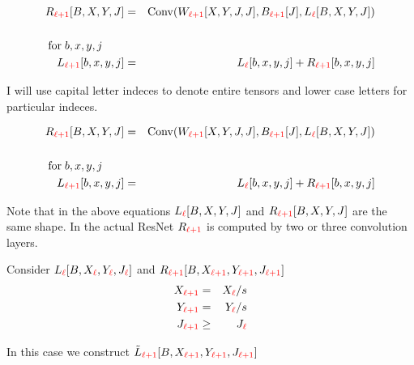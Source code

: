 {\medskip
\begin{eqnarray*}
R_{\color{red} \ell+1}[B,X,Y,J] & = & \mathrm{Conv}(W_{\color{red} \ell+1}[X,Y,J,J],B_{\color{red} \ell+1}[J],L_{\color{red} \ell}[B,X,Y,J]) \\
\\
\mathrm{for}\;b,x,y,j\;\;\;\;\;\;\;\\
L_{\color{red} \ell+1}[b,x,y,j] & = & L_{\color{red}\ell}[b,x,y,j] + R_{\color{red} \ell+1}[b,x,y,j]
\end{eqnarray*}

\vfill I will use capital letter indeces to denote entire tensors and lower case letters for particular indeces.


\medskip
\begin{eqnarray*}
R_{\color{red} \ell+1}[B,X,Y,J] & = & \mathrm{Conv}(W_{\color{red} \ell+1}[X,Y,J,J],B_{\color{red} \ell+1}[J],L_{\color{red} \ell}[B,X,Y,J]) \\
\\
\mathrm{for}\;b,x,y,j\;\;\;\;\;\;\;\\
L_{\color{red} \ell+1}[b,x,y,j] & = & L_{\color{red}\ell}[b,x,y,j] + R_{\color{red} \ell+1}[b,x,y,j]
\end{eqnarray*}

\vfill Note that in the above equations $L_{\color{red} \ell}[B,X,Y,J]$ and $R_{\color{red} \ell+1}[B,X,Y,J]$ are the same shape.
\vfill
In the actual ResNet $R_{\color{red} \ell+1}$ is computed by two or three convolution layers.


Consider $L_{\color{red} \ell}[B,X_{\color{red} \ell},Y_{\color{red} \ell},J_{\color{red} \ell}]$ and $R_{\color{red} \ell+1}[B,X_{\color{red} \ell+1},Y_{\color{red} \ell+1},J_{\color{red} \ell+1}]$
\begin{eqnarray*}
X_{\color{red} \ell+1} & = & X_{\color{red} \ell}/s \\
Y_{\color{red} \ell+1} & = & Y_{\color{red} \ell}/s \\
J_{\color{red} \ell+1} & \geq &  J_{\color{red} \ell}
\end{eqnarray*}


\vfill
In this case we construct $\tilde{L}_{\color{red} \ell +1 }[B,X_{\color{red} \ell +1},Y_{\color{red} \ell+1},J_{\color{red}\ell +1}]$

}

